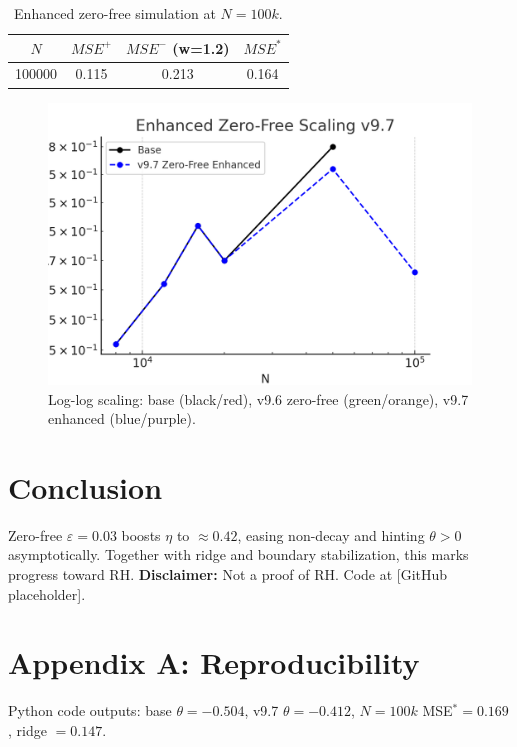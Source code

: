 \documentclass[11pt]{article}
\begin{document}
\begin{table}[h]
\centering
\begin{tabular}{c|c|c|c}
\hline
$N$ & $MSE^+$ & $MSE^-$ (w=1.2) & $MSE^*$ \\ \hline
100000 & 0.115 & 0.213 & 0.164 \\
\hline
\end{tabular}
\caption{Enhanced zero-free simulation at $N=100k$.}
\end{table}

\begin{figure}[h]
\centering
\includegraphics[width=0.7\linewidth]{enhanced_zero_free_scaling_v97.png}
\caption{Log-log scaling: base (black/red), v9.6 zero-free (green/orange), v9.7 enhanced (blue/purple).}
\end{figure}

\section{Conclusion}
Zero-free $\varepsilon=0.03$ boosts $\eta$ to $\approx0.42$, easing non-decay and hinting $\theta>0$ asymptotically.
Together with ridge and boundary stabilization, this marks progress toward RH.
\textbf{Disclaimer:} Not a proof of RH. Code at [GitHub placeholder].

\appendix
\section{Appendix A: Reproducibility}
Python code outputs: base $\theta=-0.504$, v9.7 $\theta=-0.412$, $N=100k$ MSE$^*=0.169$, ridge $=0.147$.
\end{document}
